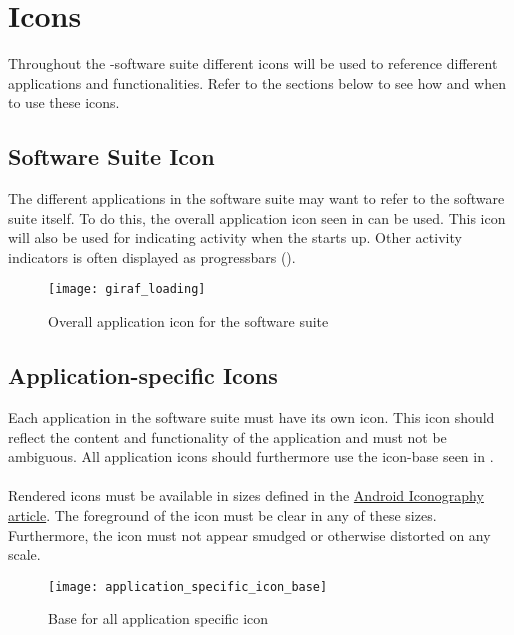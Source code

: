 
\chapter{Icons}

Throughout the \giraf-software suite different icons will be used to reference different applications and functionalities. Refer to the sections below to see how and when to use these icons.

\section{\giraf Software Suite Icon}
The different applications in the \giraf software suite may want to refer to the software suite itself. To do this, the overall application icon seen in  can be used. This icon will also be used for indicating activity when the \launcher starts up. Other activity indicators is often displayed as progressbars ().

\begin{figure}[h]
	\centering
	\texttt{[image: giraf\_loading]}
	\caption{Overall application icon for the \giraf software suite}
	\label{fig:overall_application_icon}
\end{figure}

\section{Application-specific Icons}
Each application in the \giraf software suite must have its own icon. This icon should reflect the content and functionality of the application and must not be ambiguous. All application icons should furthermore use the icon-base seen in . 
\\\\
Rendered icons must be available in sizes defined in the \href{http://developer.android.com/design/style/iconography.html}{Android Iconography article}. The foreground of the icon must be clear in any of these sizes. Furthermore, the icon must not appear smudged or otherwise distorted on any scale.

\begin{figure}[h]
	\centering
	\texttt{[image: application\_specific\_icon\_base]}
	\caption{Base for all application specific icon}
	\label{fig:application_specific_icon_base}
\end{figure}

